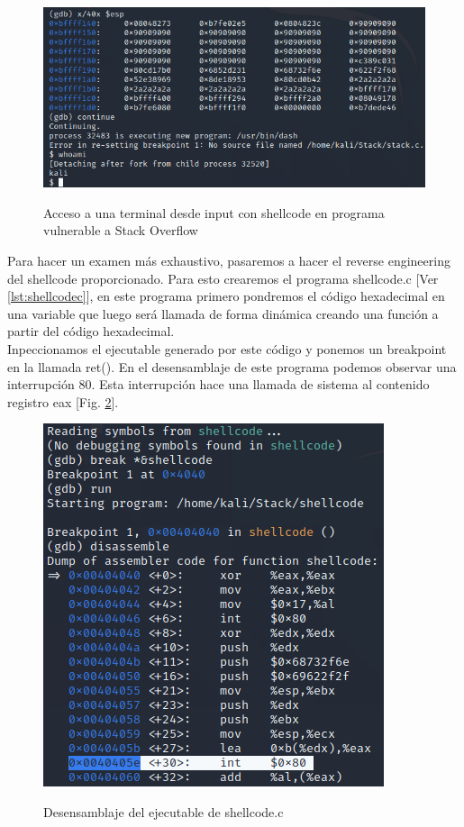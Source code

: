 \documentclass[a4paper,oneside]{article}
\begin{document}
\begin{figure}[h!]
  \centering
  \includegraphics[scale=0.5]{images/terminal.png}\\
  \caption{Acceso a una terminal desde input con shellcode en programa vulnerable a Stack Overflow}
  \label{fig:terminal}
\end{figure}

\newpage
Para hacer un examen más exhaustivo, pasaremos a hacer el reverse engineering del shellcode proporcionado. Para esto crearemos el programa shellcode.c [Ver \ref{lst:shellcodec}], en este programa primero pondremos el código hexadecimal en una variable que luego será llamada de forma dinámica creando una función a partir del código hexadecimal.\\

Inpeccionamos el ejecutable generado por este código y ponemos un breakpoint en la llamada ret(). En el desensamblaje de este programa podemos observar una interrupción 80. Esta interrupción hace una llamada de sistema al contenido registro eax [Fig. \ref{fig:disassemble}]. 

\begin{figure}[h!]
  \centering
  \includegraphics[scale=0.5]{images/disassemble.png}\\
  \caption{Desensamblaje del ejecutable de shellcode.c}
  \label{fig:disassemble}
\end{figure}
\end{document}
